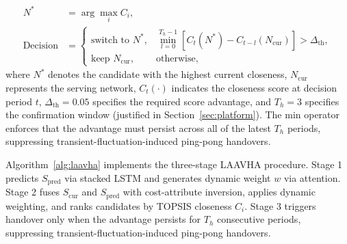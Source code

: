 \documentclass[preprint,12pt]{elsarticle}
\begin{document}
\begin{align}
N^* &= \arg\max_i C_i, \label{eq:select}\\
\mathrm{Decision} &=
\begin{cases}
\text{switch to }N^*, & \min_{l=0}^{T_h-1}\left[C_t(N^*)-C_{t-l}(N_{\mathrm{cur}})\right]>\Delta_{\mathrm{th}},\\
\text{keep }N_{\mathrm{cur}}, & \text{otherwise},
\end{cases} \label{eq:hysteresis}
\end{align}
where $N^*$ denotes the candidate with the highest current closeness, $N_{\mathrm{cur}}$ represents the serving network, $C_t(\cdot)$ indicates the closeness score at decision period $t$, $\Delta_{\mathrm{th}}=0.05$ specifies the required score advantage, and $T_h=3$ specifies the confirmation window (justified in Section~\ref{sec:platform}). The min operator enforces that the advantage must persist across all of the latest $T_h$ periods, suppressing transient-fluctuation-induced ping-pong handovers.

Algorithm~\ref{alg:laavha} implements the three-stage LAAVHA procedure. Stage 1 predicts $S_{\mathrm{pred}}$ via stacked LSTM and generates dynamic weight $w$ via attention. Stage 2 fuses $S_{\mathrm{cur}}$ and $S_{\mathrm{pred}}$ with cost-attribute inversion, applies dynamic weighting, and ranks candidates by TOPSIS closeness $C_i$. Stage 3 triggers handover only when the advantage persists for $T_h$ consecutive periods, suppressing transient-fluctuation-induced ping-pong handovers.
\end{document}
